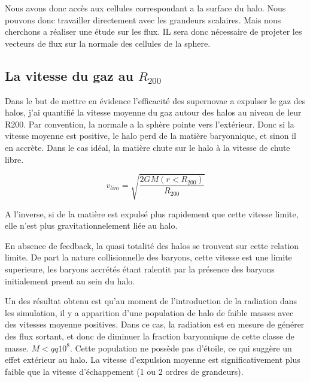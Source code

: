 Nous avons donc accès aux cellules correspondant a la surface du halo.
Nous pouvons donc travailler directement avec les grandeurs scalaires.
Mais nous cherchons a réaliser une étude sur les flux.
IL sera donc nécessaire de projeter les vecteurs de flux sur la normale des cellules de la sphere.







\subsection{La vitesse du gaz au $R_{200}$}

Dans le but de mettre en évidence l'efficacité des supernovae a expulser le gaz des halos, j'ai quantifié la vitesse moyenne du gaz autour des halos au niveau de leur R200.
Par convention, la normale a la sphère pointe vers l'extérieur.
Donc si la vitesse moyenne est positive, le halo perd de la matière baryonnique, et sinon il en accrète.
Dans le cas idéal, la matière chute sur le halo à la vitesse de chute libre.

\begin{equation}
v_{lim} = \sqrt{\frac{2 GM (r<R_{200})} {R_{200}} } 
\end{equation}

A l'inverse, si de la matière est expulsé plus rapidement que cette vitesse limite, elle n'est plus gravitationnelement liée au halo.

En absence de feedback, la quasi totalité des halos se trouvent sur cette relation limite.
De part la nature collisionnelle des baryons, cette vitesse est une limite superieure, les baryons accrétés étant ralentit par la présence des baryons initialement prsent au sein du halo.

Un des résultat obtenu est qu'au moment de l'introduction de la radiation dans les simulation, il y a apparition d'une population de halo de faible masses avec des vitesses moyenne positives.
Dans ce cas, la radiation est en mesure de générer des flux sortant, et donc de diminuer la fraction baryonnique de cette classe de masse. $M<qq 10^8$.
Cette population ne possède pas d'étoile, ce qui suggère un effet extérieur au halo.
La vitesse d'expulsion moyenne est significativement plus faible que la vitesse d'échappement (1 ou 2 ordres de grandeurs).

